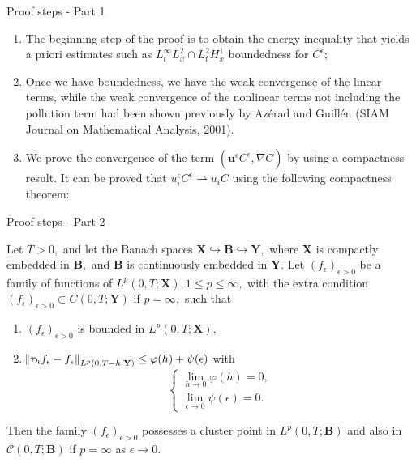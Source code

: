 \documentclass{beamer}
\begin{document}
\begin{frame}{Proof steps - Part 1}
  \begin{enumerate}
    \item The beginning step of the proof is to obtain the energy inequality that yields a priori estimates such as $L_t^\infty L_x^2 \cap L_t^2 H_x^1$ boundedness for $C^\epsilon;$ 
  
    \item Once we have boundedness, we have the weak convergence of the linear terms, while the weak convergence of the nonlinear terms not including the pollution term had been shown previously by Az\'erad and Guill\'en (SIAM Journal on Mathematical Analysis, 2001).
    
    \item We prove the convergence of the term $(\mathbf{u}^\epsilon C^\epsilon, \nabla \tilde{C})$ by using a compactness result. It can be proved that $u_i^\epsilon C^\epsilon \rightharpoonup  u_i C$ using the following compactness theorem:
  \end{enumerate}
\end{frame}

\begin{frame}{Proof steps - Part 2}

    \begin{theorem}
Let $T>0,$ and let the Banach spaces $\mathbf{X} \hookrightarrow \mathbf{B} \hookrightarrow \mathbf{Y},$ where $\mathbf{X}$ is compactly embedded in $\mathbf{B},$ and $\mathbf{B}$ is continuously embedded in $\mathbf{Y}.$ Let $(f_\epsilon)_{\epsilon>0}$ be a family of functions of $L^p (0,T; \mathbf{X}), 1 \leq p \leq \infty,$ with the extra condition $(f_\epsilon)_{\epsilon>0} \subset C (0,T; \mathbf{Y})$ if $p = \infty,$ such that
\begin{enumerate}
  \item $(f_\epsilon)_{\epsilon>0}$ is bounded in $L^p (0,T; \mathbf{X}),$
  \item $\norm{\tau_h f_\epsilon - f_\epsilon}_{L^p(0,T-h; \mathbf{Y})} \leq \varphi(h) + \psi(\epsilon)$ with
  $$
    \begin{cases}
      \lim_{h \to 0} \varphi(h) = 0,\\
      \lim_{\epsilon \to 0} \psi(\epsilon) = 0.
    \end{cases}
  $$
  \end{enumerate}
  
Then the family $(f_\epsilon)_{\epsilon>0}$ possesses a cluster point in $L^p (0,T; \mathbf{B})$ and also in $\mathcal{C}(0,T; \mathbf{B})$ if $p = \infty$ as $\epsilon \to 0.$
\end{theorem}
    
\end{frame}
\end{document}
